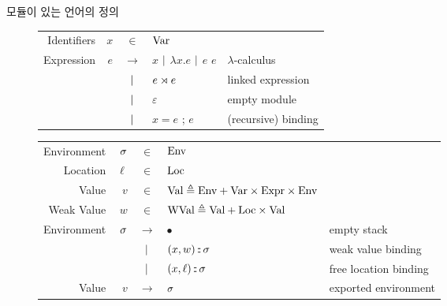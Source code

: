 \documentclass[final]{beamer}
\newlength{\colwidth}
\begin{document}
\begin{frame}[t]
\begin{columns}[t]
\begin{column}{\colwidth}
      \begin{block}{모듈이 있는 언어의 정의}
        \begin{figure}[h!]
          \large
          \begin{tabular}{rrcll}
            Identifiers & $x$ & $\in$         & $\text{Var}$                                                      \\
            Expression  & $e$ & $\rightarrow$ & $x$ $|$ $\lambda x.e$ $|$ $e$ $e$ & $\lambda$-calculus  \\
                        &     & $|$       & ${e}\rtimes{e}$                             & linked expression   \\
                        &     & $|$       & $\varepsilon$                             & empty module        \\
                        &     & $|$       & $x=e$ ; $e$                               & (recursive) binding
          \end{tabular}
        \end{figure}
        \begin{figure}[h!]
          \centering
          \large
          \begin{tabular}{rrcll}
            Environment & $\sigma$ & $\in$         & $\text{Env}$                                                                        \\
            Location    & $\ell$ & $\in$         & $\text{Loc}$                                                                        \\
            Value       & $v$    & $\in$         & $\text{Val} \triangleq\text{Env}+\text{Var}\times\text{Expr}\times\text{Env}$                         \\
            Weak Value  & $w$    & $\in$         & $\text{WVal}\triangleq\text{Val}+\text{Loc}\times\text{Val}$                                     \\
            Environment & $\sigma$ & $\rightarrow$ & $\bullet$                                             & empty stack           \\
                        &        & $|$       & $(x,w):\hskip-4pt: \sigma$                                     & weak value binding    \\
                        &        & $|$       & $(x,\ell):\hskip-4pt:\sigma$                                   & free location binding \\
            Value       & $v$    & $\rightarrow$ & $\sigma$                                                & exported environment  \\

\end{tabular}
\end{figure}
\end{block}
\end{column}
\end{columns}
\end{frame}
\end{document}
